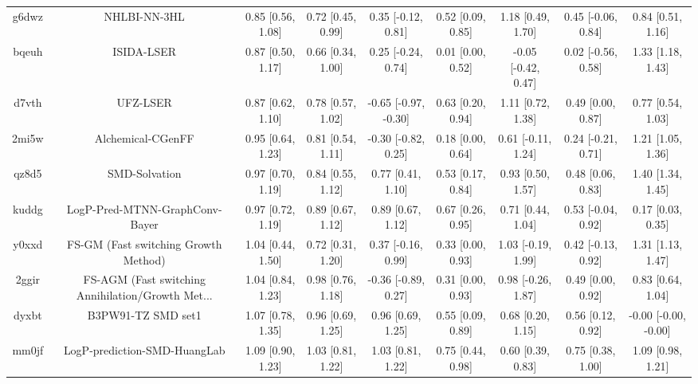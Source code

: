 \documentclass{article}
\begin{document}
\begin{center}
\begin{longtable}{|ccccccccc|}
 g6dwz &                                       NHLBI-NN-3HL &  0.85 [0.56, 1.08] &  0.72 [0.45, 0.99] &    0.35 [-0.12, 0.81] &  0.52 [0.09, 0.85] &    1.18 [0.49, 1.70] &   0.45 [-0.06, 0.84] &     0.84 [0.51, 1.16] \\
 bqeuh &                                         ISIDA-LSER &  0.87 [0.50, 1.17] &  0.66 [0.34, 1.00] &    0.25 [-0.24, 0.74] &  0.01 [0.00, 0.52] &  -0.05 [-0.42, 0.47] &   0.02 [-0.56, 0.58] &     1.33 [1.18, 1.43] \\
 d7vth &                                           UFZ-LSER &  0.87 [0.62, 1.10] &  0.78 [0.57, 1.02] &  -0.65 [-0.97, -0.30] &  0.63 [0.20, 0.94] &    1.11 [0.72, 1.38] &    0.49 [0.00, 0.87] &     0.77 [0.54, 1.03] \\
 2mi5w &                                  Alchemical-CGenFF &  0.95 [0.64, 1.23] &  0.81 [0.54, 1.11] &   -0.30 [-0.82, 0.25] &  0.18 [0.00, 0.64] &   0.61 [-0.11, 1.24] &   0.24 [-0.21, 0.71] &     1.21 [1.05, 1.36] \\
 qz8d5 &                                      SMD-Solvation &  0.97 [0.70, 1.19] &  0.84 [0.55, 1.12] &     0.77 [0.41, 1.10] &  0.53 [0.17, 0.84] &    0.93 [0.50, 1.57] &    0.48 [0.06, 0.83] &     1.40 [1.34, 1.45] \\
 kuddg &                     LogP-Pred-MTNN-GraphConv-Bayer &  0.97 [0.72, 1.19] &  0.89 [0.67, 1.12] &     0.89 [0.67, 1.12] &  0.67 [0.26, 0.95] &    0.71 [0.44, 1.04] &   0.53 [-0.04, 0.92] &     0.17 [0.03, 0.35] \\
 y0xxd &               FS-GM (Fast switching Growth Method) &  1.04 [0.44, 1.50] &  0.72 [0.31, 1.20] &    0.37 [-0.16, 0.99] &  0.33 [0.00, 0.93] &   1.03 [-0.19, 1.99] &   0.42 [-0.13, 0.92] &     1.31 [1.13, 1.47] \\
 2ggir &  FS-AGM (Fast switching Annihilation/Growth Met... &  1.04 [0.84, 1.23] &  0.98 [0.76, 1.18] &   -0.36 [-0.89, 0.27] &  0.31 [0.00, 0.93] &   0.98 [-0.26, 1.87] &    0.49 [0.00, 0.92] &     0.83 [0.64, 1.04] \\
 dyxbt &                                 B3PW91-TZ SMD set1 &  1.07 [0.78, 1.35] &  0.96 [0.69, 1.25] &     0.96 [0.69, 1.25] &  0.55 [0.09, 0.89] &    0.68 [0.20, 1.15] &    0.56 [0.12, 0.92] &  -0.00 [-0.00, -0.00] \\
 mm0jf &                       LogP-prediction-SMD-HuangLab &  1.09 [0.90, 1.23] &  1.03 [0.81, 1.22] &     1.03 [0.81, 1.22] &  0.75 [0.44, 0.98] &    0.60 [0.39, 0.83] &    0.75 [0.38, 1.00] &     1.09 [0.98, 1.21] \\

\end{longtable}
\end{center}
\end{document}
